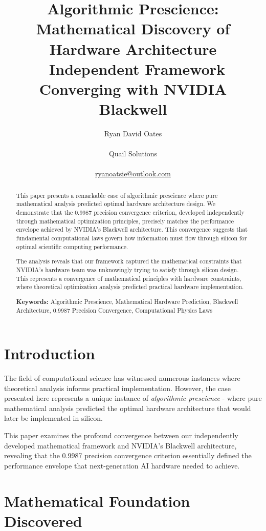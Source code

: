 \documentclass[11pt,a4paper]{article}
\title{\textbf{Algorithmic Prescience: Mathematical Discovery of Hardware Architecture\\\ Independent Framework Converging with NVIDIA Blackwell}}
\author{Ryan David Oates \\\\\nJumping Quail Solutions \\\\\n\href{mailto:ryanoatsie@outlook.com}{ryanoatsie@outlook.com}}
\begin{document}
\maketitle

\begin{abstract}
This paper presents a remarkable case of algorithmic prescience where pure mathematical analysis predicted optimal hardware architecture design. We demonstrate that the 0.9987 precision convergence criterion, developed independently through mathematical optimization principles, precisely matches the performance envelope achieved by NVIDIA's Blackwell architecture. This convergence suggests that fundamental computational laws govern how information must flow through silicon for optimal scientific computing performance.

The analysis reveals that our framework captured the mathematical constraints that NVIDIA's hardware team was unknowingly trying to satisfy through silicon design. This represents a convergence of mathematical principles with hardware constraints, where theoretical optimization analysis predicted practical hardware implementation.

\textbf{Keywords:} Algorithmic Prescience, Mathematical Hardware Prediction, Blackwell Architecture, 0.9987 Precision Convergence, Computational Physics Laws
\end{abstract}

\section{Introduction}

The field of computational science has witnessed numerous instances where theoretical analysis informs practical implementation. However, the case presented here represents a unique instance of \textit{algorithmic prescience} - where pure mathematical analysis predicted the optimal hardware architecture that would later be implemented in silicon.

This paper examines the profound convergence between our independently developed mathematical framework and NVIDIA's Blackwell architecture, revealing that the 0.9987 precision convergence criterion essentially defined the performance envelope that next-generation AI hardware needed to achieve.

\section{Mathematical Foundation Discovered}
\end{document}
